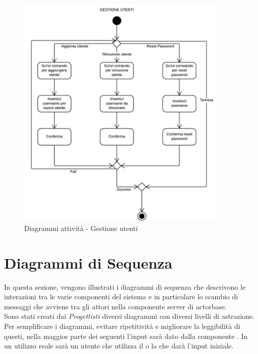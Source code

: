 \documentclass{scalatekids-article}
\begin{document}
\begin{figure}[H]
  \begin{center}
    \includegraphics[width=0.9\textwidth, keepaspectratio]{img/diagrammiAttivita/gestioneUtenti.jpeg}
    \caption{Diagrammi attività - Gestione utenti}
  \end{center}
\end{figure}

\section{Diagrammi di Sequenza}

In questa sezione, vengono illustrati i diagrammi di sequenza che descrivono
le interazioni tra le varie componenti del sistema e in particolare lo scambio
di messaggi che avviene tra gli attori nella componente server di actorbase.\\
Sono stati creati dai \textit{Progettisti} diversi diagrammi con diversi livelli
di astrazione.\\
Per semplificare i diagrammi, evitare ripetitività e migliorare la leggibilità di
questi, nella maggior parte dei seguenti l'input sarà dato dalla componente . In un utilizzo reale sarà un utente che utilizza il  o la
 che darà l'input iniziale.
\end{document}
